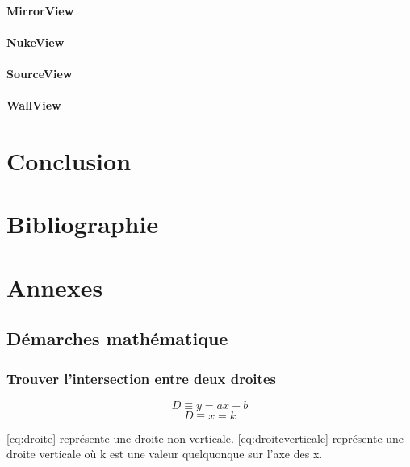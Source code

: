 \documentclass[]{article}
\begin{document}
\paragraph{MirrorView}

\paragraph{NukeView}

\paragraph{SourceView}

\paragraph{WallView}

\section{Conclusion}

\section{Bibliographie}

\section{Annexes}

\subsection{Démarches mathématique}

\subsubsection{Trouver l'intersection entre deux droites}



\begin{equation} \label{eq:droite}
	D \equiv y = ax + b 
\end{equation}
\begin{equation} \label{eq:droiteverticale}
	D \equiv x = k 
\end{equation}


\eqref {eq:droite} 
représente une droite non verticale.
\eqref {eq:droiteverticale} 
représente une droite verticale où k est une valeur
quelquonque sur l'axe des x.
\end{document}
